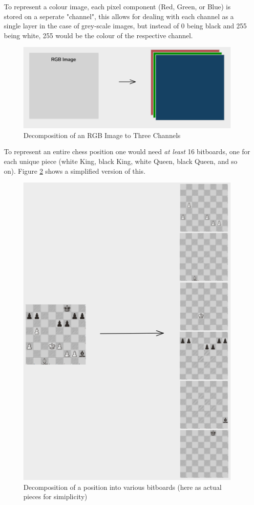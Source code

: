To represent a colour image, each pixel component (Red, Green, or Blue) is stored on a seperate "channel", this allows for dealing with each channel as a single layer in the case of grey-scale images, but instead of 0 being black and 255 being white, 255 would be the colour of the respective channel.

\begin{figure}[H]
    \centering
    \includegraphics[scale=0.5]{images/RGBtoChannels.png}
    \caption{Decomposition of an RGB Image to Three Channels}
    \label{fig: RGBChannels}
\end{figure}

To represent an entire chess position one would need \textit{at least} 16 bitboards, one for each unique piece (white King, black King, white Queen, black Queen, and so on). Figure \ref{fig: Bitboards} shows a simplified version of this.

\begin{figure}[H]
    \centering
    \includegraphics[scale=0.75]{images/BitboardDecomp.png}
    \caption{Decomposition of a position into various bitboards (here as actual pieces for simiplicity)}
    \label{fig: Bitboards}
\end{figure}
